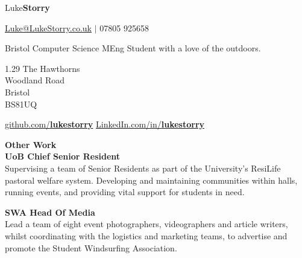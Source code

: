 \documentclass[10pt]{article}
\newcommand{\bold}[1]{\textbf{\textcolor{dark}{#1}}}
\newcommand{\sect}[1]{
\vspace{0.4em} {\LARGE\bold{#1}}\vspace{0.2em}\\}
\newcommand{\xx}[2]{{\large\bold{#1}}\\{#2}\vspace{0.5em}}
\begin{document}
\vspace{0.6em}

\begin{center}
{\color{dark}\Huge Luke\textbf{Storry}}
\hspace{0.1em}

{\large \href{mailto:Luke@LukeStorry.co.uk}{Luke@LukeStorry.co.uk}  $|$  07805 925658} 

Bristol Computer Science MEng Student with a love of the outdoors.\\
\vspace{-0.5em}
{\color{dark}\hrulefill}
\end{center}




\hspace{-1.5em}
\begin{minipage}[t]{0.34\textwidth}
\raggedright

\vspace{0.5em}

1.29  The Hawthorns\\Woodland Road\\Bristol\\BS81UQ

\vspace{0.5em}

\href{https://github.com/lukestorry}{github.com/\bold{\textcolor{dark}{lukestorry}}}
\href{https://www.linkedin.com/in/lukestorry}{LinkedIn.com/in/\bold{lukestorry}} \\

\vspace{1.5em}

\sect{Other Work}
\xx{UoB Chief Senior Resident}
{Supervising a team of Senior Residents as part of the University's ResiLife pastoral welfare system. Developing and maintaining communities within halls, running events, and providing vital support for students in need.
}

\xx{SWA Head Of Media}
{Lead a team of eight event photographers, videographers and article writers, whilst coordinating with the logistics and marketing teams, to advertise and promote the Student Windsurfing Association.
}


\end{minipage}
\end{document}
